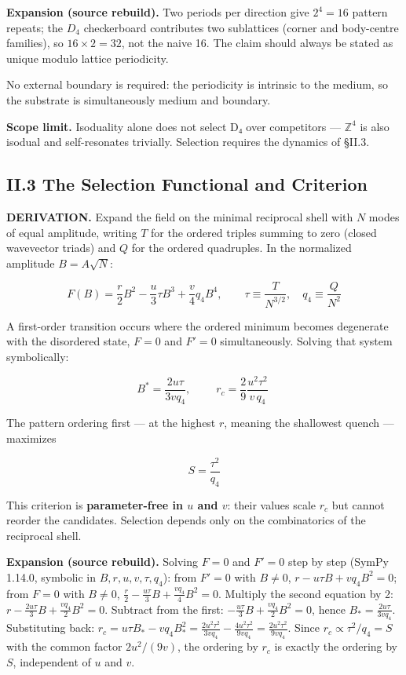 \documentclass[a4paper,11pt]{article}
\newcommand{\expansion}[1]{\par\smallskip\noindent\textbf{Expansion (source rebuild).} #1\par\smallskip}
\begin{document}
\expansion{Two periods per direction give $2^4 = 16$ pattern repeats; the $D_4$ checkerboard contributes two sublattices (corner and body-centre families), so $16 \times 2 = 32$, not the naive 16. The claim should always be stated as unique modulo lattice periodicity.}
No external boundary is required: the periodicity is intrinsic to the medium, so the substrate is simultaneously medium and boundary.

\textbf{Scope limit.} Isoduality alone does not select D₄ over competitors — $\mathbb{Z}^4$ is also isodual and self-resonates trivially. Selection requires the dynamics of §II.3.

\subsection*{II.3 The Selection Functional and Criterion}

\textbf{DERIVATION.} Expand the field on the minimal reciprocal shell with $N$ modes of equal amplitude, writing $T$ for the ordered triples summing to zero (closed wavevector triads) and $Q$ for the ordered quadruples. In the normalized amplitude $B=A\sqrt N$:

\[F(B)=\frac r2B^2-\frac u3\tau B^3+\frac v4q_4B^4,\qquad \tau\equiv\frac{T}{N^{3/2}},\quad q_4\equiv\frac{Q}{N^2}\]

A first-order transition occurs where the ordered minimum becomes degenerate with the disordered state, $F=0$ and $F'=0$ simultaneously. Solving that system symbolically:

\[B^{*}=\frac{2u\tau}{3vq_4},\qquad \boxed{\;r_c=\frac29\frac{u^2\tau^2}{v\,q_4}\;}\]

The pattern ordering first — at the highest $r$, meaning the shallowest quench — maximizes

\[S=\frac{\tau^2}{q_4}\]

This criterion is \textbf{parameter-free in $u$ and $v$}: their values scale $r_c$ but cannot reorder the candidates. Selection depends only on the combinatorics of the reciprocal shell.


\expansion{Solving $F = 0$ and $F' = 0$ step by step (SymPy 1.14.0, symbolic in $B, r, u, v, \tau, q_4$): from $F' = 0$ with $B \neq 0$, $r - u\tau B + vq_4 B^2 = 0$; from $F = 0$ with $B \neq 0$, $\tfrac{r}{2} - \tfrac{u\tau}{3}B + \tfrac{vq_4}{4}B^2 = 0$. Multiply the second equation by 2: $r - \tfrac{2u\tau}{3}B + \tfrac{vq_4}{2}B^2 = 0$. Subtract from the first: $-\tfrac{u\tau}{3}B + \tfrac{vq_4}{2}B^2 = 0$, hence $B_* = \tfrac{2u\tau}{3vq_4}$. Substituting back: $r_c = u\tau B_* - vq_4 B_*^2 = \tfrac{2u^2\tau^2}{3vq_4} - \tfrac{4u^2\tau^2}{9vq_4} = \tfrac{2u^2\tau^2}{9vq_4}$. Since $r_c \propto \tau^2/q_4 = S$ with the common factor $2u^2/(9v)$, the ordering by $r_c$ is exactly the ordering by $S$, independent of $u$ and $v$.}
\end{document}
